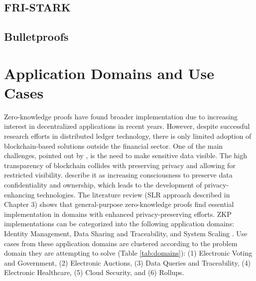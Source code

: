 \subsection{FRI-STARK}

\subsection{Bulletproofs}

\section{Application Domains and Use Cases}
Zero-knowledge proofs have found broader implementation due to increasing interest in decentralized applications in recent years. However, despite successful research efforts in distributed ledger technology, there is only limited adoption of blockchain-based solutions outside the financial sector. One of the main challenges, pointed out by \citet{SedlmeirTransparencyChallenge}, is the need to make sensitive data visible. The high transparency of blockchain collides with preserving privacy and allowing for restricted visibility. \citet{Godden} describe it as increasing consciousness to preserve data confidentiality and ownership, which leads to the development of privacy-enhancing technologies. The literature review (SLR approach described in Chapter 3) shows that general-purpose zero-knowledge proofs find essential implementation in domains with enhanced privacy-preserving efforts. ZKP implementations can be categorized into the following application domains: Identity Management, Data Sharing and Traceability, and System Scaling \citep{PipeZK, chen2022review, morais2019survey}. Use cases from these application domains are clustered according to the problem domain they are attempting to solve (Table \ref{tab:domains}): (1) Electronic Voting and Government, (2) Electronic Auctions, (3) Data Queries and Traceability, (4) Electronic Healthcare, (5) Cloud Security, and (6) Rollups.

